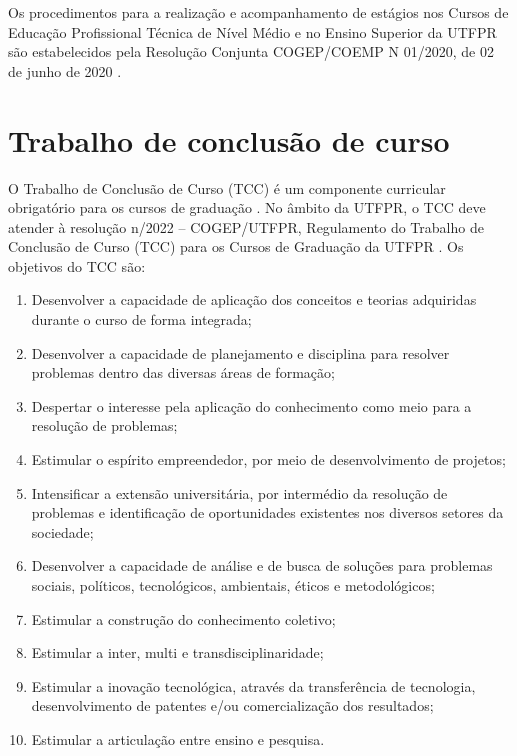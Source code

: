 Os procedimentos para a realização e acompanhamento de estágios nos Cursos de Educação Profissional Técnica de Nível Médio e no Ensino Superior da UTFPR são estabelecidos pela Resolução Conjunta COGEP/COEMP N\textordmasculine{} 01/2020, de 02 de junho de 2020 \cite{cogepcoemp1:2020}.


\section{Trabalho de conclusão de curso}

O Trabalho de Conclusão de Curso (TCC) é um componente curricular obrigatório para os cursos de graduação \cite{dcneng}. No âmbito da UTFPR, o TCC deve atender à resolução n/2022 – COGEP/UTFPR, Regulamento do Trabalho de Conclusão de Curso (TCC) para os Cursos de Graduação da UTFPR \cite{cogep180}. Os objetivos do TCC são:

\begin{enumerate}
	\item Desenvolver a capacidade de aplicação dos conceitos e teorias adquiridas durante o curso de forma integrada;
	\item Desenvolver a capacidade de planejamento e disciplina para resolver problemas dentro das diversas áreas de formação;
	\item Despertar o interesse pela aplicação do conhecimento como meio para a resolução de problemas;
	\item Estimular o espírito empreendedor, por meio de desenvolvimento de projetos;
	\item Intensificar a extensão universitária, por intermédio da resolução de problemas e identificação de oportunidades existentes nos diversos setores da sociedade;
	\item Desenvolver a capacidade de análise e de busca de soluções para problemas sociais, políticos, tecnológicos, ambientais, éticos e metodológicos;
	\item Estimular a construção do conhecimento coletivo; 
	\item Estimular a inter, multi e transdisciplinaridade;
	\item Estimular a inovação tecnológica, através da transferência de tecnologia, desenvolvimento de patentes e/ou comercialização dos resultados;
	\item Estimular a articulação entre ensino e pesquisa.  
		
\end{enumerate}

